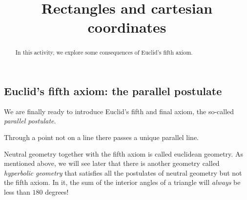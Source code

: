 \documentclass[newpage,hints,handout,noauthor,nooutcomes,12pt]{ximera}
\title{Rectangles and cartesian coordinates}
\begin{document}
\begin{abstract}
In this activity, we explore some consequences of Euclid's fifth
axiom.
\end{abstract}
\maketitle

\subsection{Euclid's fifth axiom: the parallel postulate}

We are finally ready to introduce Euclid's fifth and final axiom, the
so-called \textit{parallel postulate}.
\setcounter{axiom}{4} 
\begin{axiom}
Through a point not on a line there passes a unique parallel line.
\end{axiom}

Neutral geometry together with the fifth axiom is called euclidean
geometry. As mentioned above, we will see later that there is another
geometry called \textit{hyperbolic geometry} that satisfies all the
postulates of neutral geometry but not the fifth axiom. In it, the sum
of the interior angles of a triangle will \textit{always} be less than
$180$ degrees!
\end{document}
